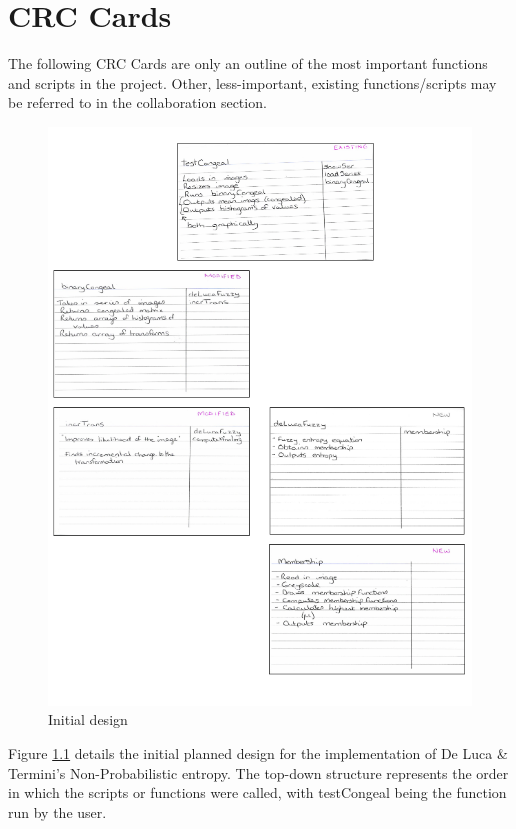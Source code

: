
\chapter{CRC Cards}
\label{appendix:crc-cards}

The following \acrshort{CRC} Cards are only an outline of the most important functions and scripts in the project. Other, less-important, existing functions/scripts may be referred to in the collaboration section.

\begin{figure}[H]
  \center
  \includegraphics[scale=0.5]{Appendix4/imgs/initial.png}
  \caption{Initial design}
  \label{fig:initial-design}
\end{figure}

Figure \ref{fig:initial-design} details the initial planned design for the implementation of De Luca \& Termini's Non-Probabilistic entropy. The top-down structure represents the order in which the scripts or functions were called, with testCongeal being the function run by the user.

